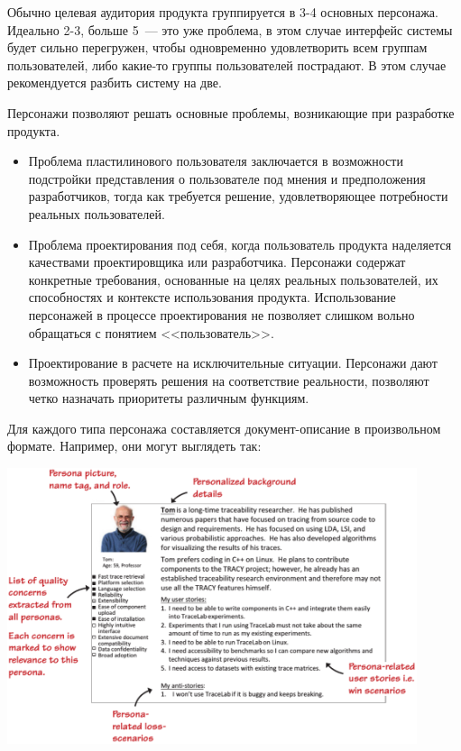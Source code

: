 \documentclass{../../text-style}
\begin{document}
Обычно целевая аудитория продукта группируется в 3-4 основных персонажа. Идеально 2-3, больше 5~--- это уже проблема, в этом случае интерфейс системы будет сильно перегружен, чтобы одновременно удовлетворить всем группам пользователей, либо какие-то группы пользователей пострадают. В этом случае рекомендуется разбить систему на две.

Персонажи позволяют решать основные проблемы, возникающие при разработке продукта.

\begin{itemize}
    \item Проблема пластилинового пользователя заключается в возможности подстройки представления о пользователе под мнения и предположения разработчиков, тогда как требуется решение, удовлетворяющее потребности реальных пользователей.
    \item Проблема проектирования под себя, когда пользователь продукта наделяется качествами проектировщика или разработчика. Персонажи содержат конкретные требования, основанные на целях реальных пользователей, их способностях и контексте использования продукта. Использование персонажей в процессе проектирования не позволяет слишком вольно обращаться с понятием <<пользователь>>.
    \item Проектирование в расчете на исключительные ситуации. Персонажи дают возможность проверять решения на соответствие реальности, позволяют четко назначать приоритеты различным функциям.
\end{itemize}

Для каждого типа персонажа составляется документ-описание в произвольном формате. Например, они могут выглядеть так:

\begin{center}
    \includegraphics[width=0.9\textwidth]{tom.png}
\end{center}
\end{document}

